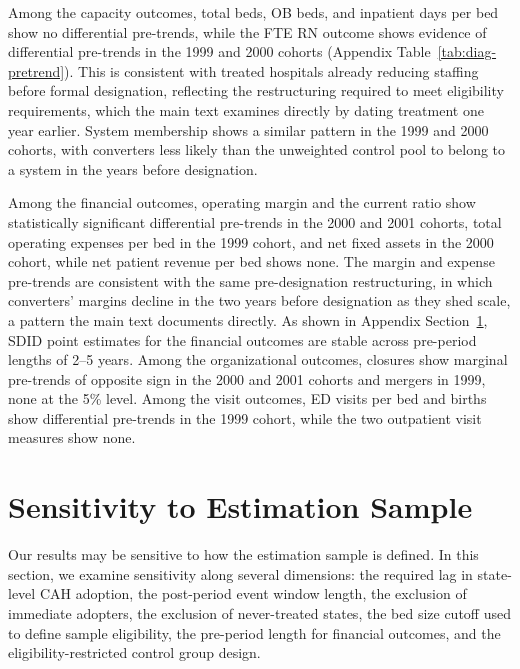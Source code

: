 \documentclass[a4paper, 12pt]{article}
\begin{document}
Among the capacity outcomes, total beds, OB beds, and inpatient days per bed show no differential pre-trends, while the FTE RN outcome shows evidence of differential pre-trends in the 1999 and 2000 cohorts (Appendix Table~\ref{tab:diag-pretrend}). This is consistent with treated hospitals already reducing staffing before formal designation, reflecting the restructuring required to meet eligibility requirements, which the main text examines directly by dating treatment one year earlier. System membership shows a similar pattern in the 1999 and 2000 cohorts, with converters less likely than the unweighted control pool to belong to a system in the years before designation.

Among the financial outcomes, operating margin and the current ratio show statistically significant differential pre-trends in the 2000 and 2001 cohorts, total operating expenses per bed in the 1999 cohort, and net fixed assets in the 2000 cohort, while net patient revenue per bed shows none. The margin and expense pre-trends are consistent with the same pre-designation restructuring, in which converters' margins decline in the two years before designation as they shed scale, a pattern the main text documents directly. As shown in Appendix Section~\ref{sec:app-sample}, SDID point estimates for the financial outcomes are stable across pre-period lengths of 2--5 years. Among the organizational outcomes, closures show marginal pre-trends of opposite sign in the 2000 and 2001 cohorts and mergers in 1999, none at the 5\% level. Among the visit outcomes, ED visits per bed and births show differential pre-trends in the 1999 cohort, while the two outpatient visit measures show none.



\section{Sensitivity to Estimation Sample}
\label{sec:app-sample}

Our results may be sensitive to how the estimation sample is defined. In this section, we examine sensitivity along several dimensions: the required lag in state-level CAH adoption, the post-period event window length, the exclusion of immediate adopters, the exclusion of never-treated states, the bed size cutoff used to define sample eligibility, the pre-period length for financial outcomes, and the eligibility-restricted control group design.
\end{document}
